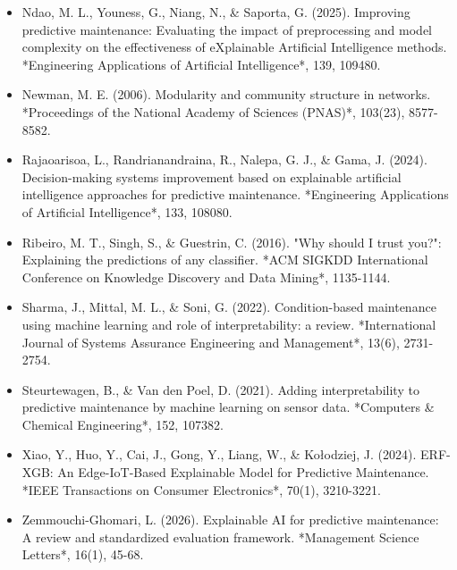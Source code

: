 \documentclass[10pt,a4paper,journal]{article}
\begin{document}
\begin{itemize}
\item Ndao, M. L., Youness, G., Niang, N., \& Saporta, G. (2025). Improving predictive maintenance: Evaluating the impact of preprocessing and model complexity on the effectiveness of eXplainable Artificial Intelligence methods. *Engineering Applications of Artificial Intelligence*, 139, 109480.
\end{itemize}
\begin{itemize}
\item Newman, M. E. (2006). Modularity and community structure in networks. *Proceedings of the National Academy of Sciences (PNAS)*, 103(23), 8577-8582.
\end{itemize}
\begin{itemize}
\item Rajaoarisoa, L., Randrianandraina, R., Nalepa, G. J., \& Gama, J. (2024). Decision-making systems improvement based on explainable artificial intelligence approaches for predictive maintenance. *Engineering Applications of Artificial Intelligence*, 133, 108080.
\end{itemize}
\begin{itemize}
\item Ribeiro, M. T., Singh, S., \& Guestrin, C. (2016). "Why should I trust you?": Explaining the predictions of any classifier. *ACM SIGKDD International Conference on Knowledge Discovery and Data Mining*, 1135-1144.
\end{itemize}
\begin{itemize}
\item Sharma, J., Mittal, M. L., \& Soni, G. (2022). Condition-based maintenance using machine learning and role of interpretability: a review. *International Journal of Systems Assurance Engineering and Management*, 13(6), 2731-2754.
\end{itemize}
\begin{itemize}
\item Steurtewagen, B., \& Van den Poel, D. (2021). Adding interpretability to predictive maintenance by machine learning on sensor data. *Computers \& Chemical Engineering*, 152, 107382.
\end{itemize}
\begin{itemize}
\item Xiao, Y., Huo, Y., Cai, J., Gong, Y., Liang, W., \& Kołodziej, J. (2024). ERF-XGB: An Edge-IoT-Based Explainable Model for Predictive Maintenance. *IEEE Transactions on Consumer Electronics*, 70(1), 3210-3221.
\end{itemize}
\begin{itemize}
\item Zemmouchi-Ghomari, L. (2026). Explainable AI for predictive maintenance: A review and standardized evaluation framework. *Management Science Letters*, 16(1), 45-68.
\end{itemize}
\end{document}
